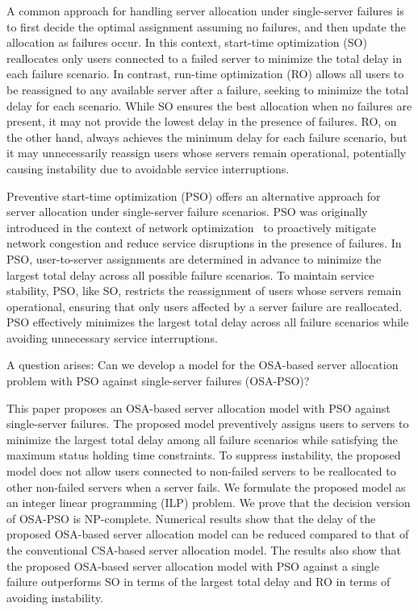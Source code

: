 \documentclass[10pt, letterpaper]{IEEEtran}
\begin{document}
\begin{CJK}{UTF8}{ipxm}
A common approach for handling server allocation under single-server failures is to first decide the optimal assignment assuming no failures, and then update the allocation as failures occur. 
In this context, start-time optimization (SO) reallocates only users connected to a failed server to minimize the total delay in each failure scenario. 
In contrast, run-time optimization (RO) allows all users to be reassigned to any available server after a failure, seeking to minimize the total delay for each scenario. 
While SO ensures the best allocation when no failures are present, it may not provide the lowest delay in the presence of failures. 
RO, on the other hand, always achieves the minimum delay for each failure scenario, but it may unnecessarily reassign users whose servers remain operational, potentially causing instability due to avoidable service interruptions.

Preventive start-time optimization (PSO) offers an alternative approach for server allocation under single-server failure scenarios. 
PSO was originally introduced in the context of network optimization~\cite{5_9_13_Kamrul2010,OkiDRCN2014} to proactively mitigate network congestion and reduce service disruptions in the presence of failures. 
In PSO, user-to-server assignments are determined in advance to minimize the largest total delay across all possible failure scenarios. 
To maintain service stability, PSO, like SO, restricts the reassignment of users whose servers remain operational, ensuring that only users affected by a server failure are reallocated. 
PSO effectively minimizes the largest total delay across all failure scenarios while avoiding unnecessary service interruptions.

A question arises: 
Can we develop a model for the OSA-based server allocation problem with PSO against single-server failures (OSA-PSO)?

This paper proposes an OSA-based server allocation model with PSO against single-server failures.
The proposed model preventively assigns users to servers to minimize the largest total delay among all failure scenarios while satisfying the maximum status holding time constraints.
To suppress instability, the proposed model does not allow users connected to non-failed servers to be reallocated to other non-failed servers when a server fails.
We formulate the proposed model as an integer linear programming (ILP) problem.
We prove that the decision version of OSA-PSO is NP-complete.
Numerical results show that the delay of the proposed OSA-based server allocation model can be reduced compared to that of the conventional CSA-based server allocation model.
The results also show that the proposed OSA-based server allocation model with PSO against a single failure outperforms SO in terms of the largest total delay and RO in terms of avoiding instability.


\end{CJK}
\end{document}
